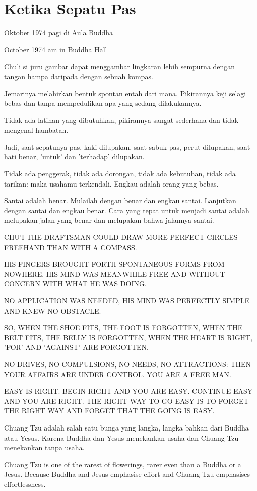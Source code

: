 \chapter{Ketika Sepatu Pas}

 Oktober 1974 pagi di Aula Buddha

 October 1974 am in Buddha Hall

\bahasa
Chu'i si juru gambar dapat menggambar lingkaran lebih sempurna dengan tangan hampa daripada dengan sebuah kompas.

Jemarinya melahirkan bentuk spontan entah dari mana. Pikirannya keji selagi bebas dan tanpa mempedulikan apa yang sedang dilakukannya.

Tidak ada latihan yang dibutuhkan, pikirannya sangat sederhana dan tidak mengenal hambatan.

Jadi, saat sepatunya pas, kaki dilupakan, saat sabuk pas, perut dilupakan, saat hati benar, 'untuk' dan 'terhadap' dilupakan.

Tidak ada penggerak, tidak ada dorongan, tidak ada kebutuhan, tidak ada tarikan: maka usahamu terkendali. Engkau adalah orang yang bebas.

Santai adalah benar. Mulailah dengan benar dan engkau santai. Lanjutkan dengan santai dan engkau benar. Cara yang tepat untuk menjadi santai adalah melupakan jalan yang benar dan melupakan bahwa jalannya santai.

\english
CHU'I THE DRAFTSMAN COULD DRAW MORE PERFECT CIRCLES FREEHAND THAN WITH A COMPASS.

HIS FINGERS BROUGHT FORTH SPONTANEOUS FORMS FROM NOWHERE. HIS MIND WAS MEANWHILE FREE AND WITHOUT CONCERN WITH WHAT HE WAS DOING.

NO APPLICATION WAS NEEDED, HIS MIND WAS PERFECTLY SIMPLE AND KNEW NO OBSTACLE.

SO, WHEN THE SHOE FITS, THE FOOT IS FORGOTTEN, WHEN THE BELT FITS, THE BELLY IS FORGOTTEN, WHEN THE HEART IS RIGHT, ’FOR’ AND ’AGAINST’ ARE FORGOTTEN.

NO DRIVES, NO COMPULSIONS, NO NEEDS, NO ATTRACTIONS: THEN YOUR AFFAIRS ARE UNDER CONTROL. YOU ARE A FREE MAN.

EASY IS RIGHT. BEGIN RIGHT AND YOU ARE EASY. CONTINUE EASY AND YOU ARE RIGHT. THE RIGHT WAY TO GO EASY IS TO FORGET THE RIGHT WAY AND FORGET THAT THE GOING IS EASY.

\bahasa
Chuang Tzu adalah salah satu bunga yang langka, langka bahkan dari Buddha atau Yesus. Karena Buddha dan Yesus menekankan usaha dan Chuang Tzu menekankan tanpa usaha.

\english
Chuang Tzu is one of the rarest of flowerings, rarer even than a Buddha or a Jesus. Because Buddha and Jesus emphasise effort and Chuang Tzu emphasises effortlessness.


